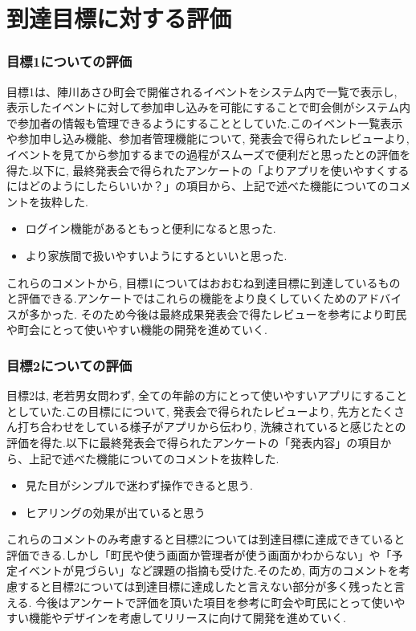 \chapter{到達目標に対する評価}

\subsection{目標1についての評価}
目標1は、陣川あさひ町会で開催されるイベントをシステム内で一覧で表示し, 表示したイベントに対して参加申し込みを可能にすることで町会側がシステム内で参加者の情報も管理できるようにすることとしていた.このイベント一覧表示や参加申し込み機能、参加者管理機能について, 発表会で得られたレビューより, イベントを見てから参加するまでの過程がスムーズで便利だと思ったとの評価を得た.以下に, 最終発表会で得られたアンケートの「よりアプリを使いやすくするにはどのようにしたらいいか？」の項目から、上記で述べた機能についてのコメントを抜粋した.

\begin{itemize}
    \item ログイン機能があるともっと便利になると思った.
    \item より家族間で扱いやすいようにするといいと思った.
\end{itemize}

これらのコメントから, 目標1についてはおおむね到達目標に到達しているものと評価できる.アンケートではこれらの機能をより良くしていくためのアドバイスが多かった. そのため今後は最終成果発表会で得たレビューを参考により町民や町会にとって使いやすい機能の開発を進めていく.

\subsection{目標2についての評価}
目標2は, 老若男女問わず, 全ての年齢の方にとって使いやすいアプリにすることとしていた.この目標にについて, 発表会で得られたレビューより, 先方とたくさん打ち合わせをしている様子がアプリから伝わり, 洗練されていると感じたとの評価を得た.以下に最終発表会で得られたアンケートの「発表内容」の項目から、上記で述べた機能についてのコメントを抜粋した.

\begin{itemize}
    \item 見た目がシンプルで迷わず操作できると思う.
    \item ヒアリングの効果が出ていると思う
\end{itemize}

これらのコメントのみ考慮すると目標2については到達目標に達成できていると評価できる.しかし「町民や使う画面か管理者が使う画面かわからない」や「予定イベントが見づらい」など課題の指摘も受けた.そのため, 両方のコメントを考慮すると目標2については到達目標に達成したと言えない部分が多く残ったと言える.
今後はアンケートで評価を頂いた項目を参考に町会や町民にとって使いやすい機能やデザインを考慮してリリースに向けて開発を進めていく.